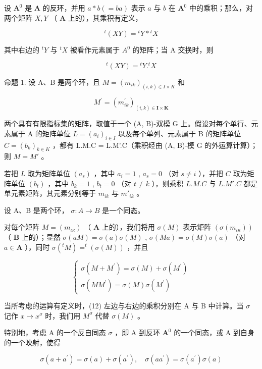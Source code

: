 设 \(\mathbf{A}^0\) 是 \(\mathbf{A}\) 的反环，并用 \(a * b (= ba)\) 表示 \(a\) 与 \(b\) 在 \(\mathbf{A}^0\) 中的乘积；那么，对两个矩阵 \(X, Y\) （ \(\mathbf{A}\) 上的），其乘积有定义，

\[
{ } ^ { t } ( X Y ) = { } ^ { t } Y * { } ^ { t } X\tag{10}
\]

其中右边的 \(^{t}Y\) 与 \(^{t}X\) 被看作元素属于 \(A^{0}\) 的矩阵；当 A 交换时，则

\[
{ } ^ { t } ( X Y ) = { } ^ { t } Y . { } ^ { t } X\tag{11}
\]

命题 1. 设 A、B 是两个环，且 \(M = (m_{ik})_{(i,k) \in I \times K}\) 和

\[
M ^ {\prime} = \left(m _ {i k} ^ {\prime}\right) _ {(i, k) \in \mathbf {I} \times \mathbf {K}}
\]

两个具有有限指标集的矩阵，取值于一个 (A, B)-双模 G 上。假设对每个单行、元素属于 A 的矩阵单位 \(L = (a_{i})_{i \in I}\) 以及每个单列、元素属于 B 的矩阵单位 \(C = (b_{k})_{k \in K}\) ，都有 L.M.C = L.M'.C（乘积经由 (A, B)-模 G 的外运算计算）；则 \(M = M'\) 。

若把 \(L\) 取为矩阵单位 \((a_s)\) ，其中 \(a_i = 1\) , \(a_s = 0\) （对 \(s \neq i\) ），并把 \(C\) 取为矩阵单位 \((b_t)\) ，其中 \(b_k = 1\) , \(b_t = 0\) （对 \(t \neq k\) ），则乘积 \(L.M.C\) 与 \(L.M'.C\) 都是单元素矩阵，其元素分别等于 \(m_{ik}\) 与 \(m'_{ik}\) 。

设 A、B 是两个环， \(\sigma: A \to B\) 是一个同态。

对每个矩阵 \(M = (m_{\iota\kappa})\) （ \(\mathbf{A}\) 上的），我们将用 \(\sigma(M)\) 表示矩阵 \((\sigma(m_{\iota\kappa}))\) （ \(\mathbf{B}\) 上的）；显然 \(\sigma(aM) = \sigma(a)\sigma(M)\) , \(\sigma(Ma) = \sigma(M)\sigma(a)\) （对 \(a \in \mathbf{A}\) ），同时 \(\sigma(^t M) = ^t(\sigma(M))\) ，并且

\[
\left\{ \begin{array}{c} \sigma (M + M ^ {\prime}) = \sigma (M) + \sigma (M ^ {\prime}) \\ \sigma (M M ^ {\prime}) = \sigma (M) \sigma (M ^ {\prime}) \end{array} \right.\tag{12}
\]

当所考虑的运算有定义时，(12) 左边与右边的乘积分别在 A 与 B 中计算。当 \(\sigma\) 记作 \(x \mapsto x^{\sigma}\) 时，我们用 \(M^{\sigma}\) 代替 \(\sigma(M)\) 。

特别地，考虑 A 的一个反自同态 \(\sigma\) ，即 A 到反环 \(\mathbf{A}^0\) 的一个同态，或 A 到自身的一个映射，使得

\[
\sigma (a + a ^ {\prime}) = \sigma (a) + \sigma (a ^ {\prime}), \quad \sigma (a a ^ {\prime}) = \sigma (a ^ {\prime}) \sigma (a)
\]


